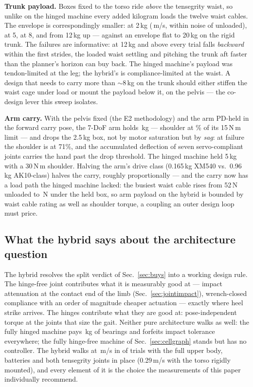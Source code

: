 \documentclass[conference]{IEEEtran}
\begin{document}
\textbf{Trunk payload.} Boxes fixed to the torso ride \emph{above} the
tensegrity waist, so unlike on the hinged machine every added kilogram loads
the twelve waist cables. The envelope is correspondingly smaller:
\hsPayTwoRate{} at 2\,kg (\hsPayTwoV\,m/s, within noise of unloaded),
\hsPayFiveRate{} at 5, \hsPayEightRate{} at 8, and \hsPayTwelveRate{} from
12\,kg up --- against an envelope flat to 20\,kg on the rigid trunk. The
failures are informative: at 12\,kg and above every trial falls
\emph{backward} within the first strides, the loaded waist settling and
pitching the trunk aft faster than the planner's horizon can buy back. The
hinged machine's payload was tendon-limited at the leg; the hybrid's is
compliance-limited at the waist. A design that needs to carry more than
$\sim$8\,kg on the trunk should either stiffen the waist cage under load or
mount the payload below it, on the pelvis --- the co-design lever this sweep
isolates.

\textbf{Arm carry.} With the pelvis fixed (the E2 methodology) and the arm
PD-held in the forward carry pose, the 7-DoF arm holds \hsCarryMax\,kg
--- shoulder at \hsCarryUtil\% of its 15\,N\,m limit --- and drops the
2.5\,kg box, not by motor saturation but by \emph{sag}: at failure the
shoulder is at 71\%, and the accumulated deflection of seven
servo-compliant joints carries the hand past the drop threshold. The hinged
machine held 5\,kg with a 30\,N\,m shoulder. Halving the arm's drive class
(0.165\,kg XM540 vs.\ 0.96\,kg AK10-class) halves the carry, roughly
proportionally --- and the carry now has a load path the hinged machine
lacked: the busiest waist cable rises from 52\,N unloaded to
\hsCarryWaistT\,N under the held box, so arm payload on the hybrid is
bounded by waist cable rating as well as shoulder torque, a coupling an
outer design loop must price.

\subsection{What the hybrid says about the architecture question}
The hybrid resolves the split verdict of Sec.~\ref{sec:buys} into a working
design rule. The hinge-free joint contributes what it is measurably good at
--- impact attenuation at the contact end of the limb
(Sec.~\ref{sec:jointimpact}), wrench-closed compliance with an order of
magnitude cheaper actuation --- exactly where heel strike arrives. The hinges
contribute what they are good at: pose-independent torque at the joints that
size the gait. Neither pure architecture walks as well: the fully hinged
machine pays \bearingMass\,kg of bearings and forfeits impact tolerance
everywhere; the fully hinge-free machine of Sec.~\ref{sec:cellgraph} stands
but has no controller. The hybrid walks at \hybridSpeed\,m/s in \hybridRate{} of trials with the
full upper body, batteries and both tensegrity joints in place (0.29\,m/s
with the torso rigidly mounted), and every element of it is the choice the
measurements of this paper individually recommend.
\end{document}
